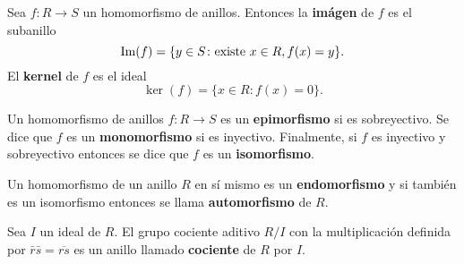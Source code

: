 \begin{definicion}
Sea $f \colon R \to S$ un homomorfismo de anillos. Entonces la \textbf{imágen} de $f$ es el subanillo \[\operatorname{Im} (f) = \{ y \in S \colon \mbox{existe } x \in R, f(x)=y \}. \]
El \textbf{kernel} de $f$ es el ideal\[ \ker(f) = \{ x \in R \colon f(x) = 0 \}. \]
\end{definicion}
\begin{definicion}
Un homomorfismo de anillos $f \colon R \to S$ es un \textbf{epimorfismo} si es sobreyectivo. Se dice que $f$ es un \textbf{monomorfismo} si es inyectivo. Finalmente, si $f$ es inyectivo y sobreyectivo entonces se dice que $f$ es un \textbf{isomorfismo}.
\end{definicion}
Un homomorfismo de un anillo $R$ en sí mismo es un \textbf{endomorfismo} y si también es un isomorfismo entonces se llama \textbf{automorfismo} de $R$.
\begin{definicion}
Sea $I$ un ideal de $R$. El grupo cociente aditivo $R/I$ con la multiplicación definida por $\bar{r}\bar{s} = \overline{rs}$ es un anillo llamado \textbf{cociente} de $R$ por $I$. 
\end{definicion}

